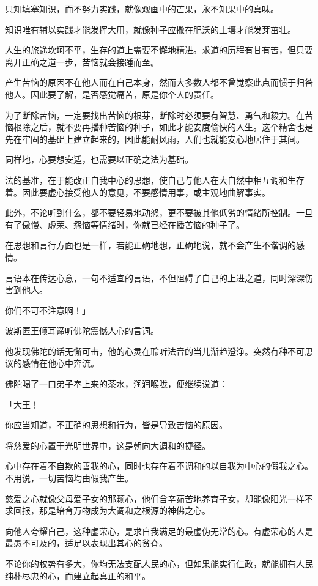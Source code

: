 \documentclass[twoside,openany]{book}
\begin{document}
只知填塞知识，而不努力实践，就像观画中的芒果，永不知果中的真味。

知识唯有辅以实践才能发挥大用，就像种子应撒在肥沃的土壤才能发芽茁壮。

人生的旅途坎坷不平，生存的道上需要不懈地精进。求道的历程有甘有苦，但只要离开正确之道一步，苦恼就会接踵而至。

产生苦恼的原因不在他人而在自己本身，然而大多数人都不曾觉察此点而惯于归咎他人。因此要了解，是否感觉痛苦，原是你个人的责任。

为了断除苦恼，一定要找出苦恼的根芽，断除时必须要有智慧、勇气和毅力。在苦恼根除之后，就不要再播种苦恼的种子，如此才能安度偷快的人生。这个精舍也是先在牢固的基础上建立起来的，因此能耐风雨，人们也就能安心地居住于其间。

同样地，心要想安适，也需要以正确之法为基础。

法的基准，在于能改正自我中心的思想，使自己与他人在大自然中相互调和生存着。因此要虚心接受他人的意见，不要感情用事，或主观地曲解事实。

此外，不论听到什么，都不要轻易地动怒，更不要被其他低劣的情绪所控制。一旦有了傲慢、虚荣、怨恼等情绪时，你就已经在播苦恼的种子了。

在思想和言行方面也是一样，若能正确地想，正确地说，就不会产生不谐调的感情。

言语本在传达心意，一句不适宜的言语，不但阻碍了自己的上进之道，同时深深伤害到他人。

你们不可不注意啊！」

波斯匿王倾耳谛听佛陀震憾人心的言词。

他发现佛陀的话无懈可击，他的心灵在聆听法音的当儿渐趋澄浄。突然有种不可思议的感情在他心中奔流。

佛陀喝了一口弟子奉上来的茶水，润润喉咙，便继续说道：

「大王！

你应当知道，不正确的思想和行为，皆是导致苦恼的原因。

将慈爱的心置于光明世界中，这是朝向大调和的捷径。

心中存在着不自欺的善我的心，同时也存在着不调和的以自我为中心的假我之心。不用说，一切苦恼均由假我产生。

慈爱之心就像父母爱子女的那颗心，他们含辛茹苦地养育子女，却能像阳光一样不求回报，那是培育万物成为大调和之根源的神佛之心。

向他人夸耀自己，这种虚荣心，是求自我满足的最虚伪无常的心。有虚荣心的人是最愚不可及的，适足以表现出其心的贫脊。

不论你的权势有多大，你均无法支配人民的心，但如果能实行仁政，就能拥有人民纯朴尽忠的心，而建立起真正的和平。
\end{document}

